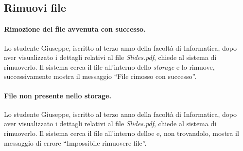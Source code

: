\subsection{Rimuovi file}
\paragraph{Rimozione del file avvenuta con successo.}
Lo studente Giuseppe, iscritto al terzo anno della facoltà di Informatica, dopo aver visualizzato i dettagli relativi al file \textit{Slides.pdf}, chiede al sistema di rimuoverlo. Il sistema cerca il file all'interno dello \textit{storage} e lo rimuove, successivamente mostra il messaggio “File rimosso con successo”.
	
\paragraph{File non presente nello \textbf{storage}.}
Lo studente Giuseppe, iscritto al terzo anno della facoltà di Informatica, dopo aver visualizzato i dettagli relativi al file \textit{Slides.pdf}, chiede al sistema di rimuoverlo. Il sistema cerca il file all'interno delloe e, non trovandolo, mostra il messaggio di errore “Impossibile rimuovere file”.



\newpage


